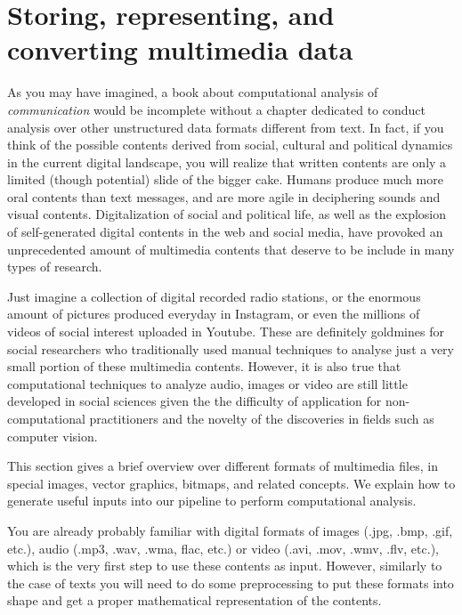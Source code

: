 \section{Storing, representing, and converting multimedia data}
\label{sec:storing}

As you may have imagined, a book about computational analysis of \textit{communication} would be incomplete without a chapter dedicated to conduct analysis over other unstructured data formats different from text. In fact, if you think of the possible contents derived from social, cultural and political dynamics in the current digital landscape, you will realize that written contents are only a limited (though potential) slide of the bigger cake. Humans produce much more oral contents than text messages, and are more agile in deciphering sounds and visual contents. Digitalization of social and political life, as well as the explosion of self-generated digital contents in the web and social media, have provoked an unprecedented amount of multimedia contents that deserve to be include in many types of research.

Just imagine a collection of digital recorded radio stations, or the enormous amount of pictures produced everyday in Instagram, or even the millions of videos of social interest uploaded in Youtube. These are definitely goldmines for social researchers who traditionally used manual techniques to analyse just a very small portion of these multimedia contents. However, it is also true that computational techniques to analyze audio, images or video are still little developed in social sciences given the the difficulty of application for non-computational practitioners and the novelty of the discoveries in fields such as computer vision. 

This section gives a brief overview over different formats of multimedia files, in special images, vector graphics, bitmaps, and related concepts. We explain how to generate useful inputs into our pipeline to perform computational analysis.

You are already probably familiar with digital formats of images (.jpg, .bmp, .gif, etc.), audio (.mp3, .wav, .wma, flac, etc.) or video (.avi, .mov, .wmv, .flv, etc.), which is the very first step to use these contents as input. However, similarly to the case of texts you will need to do some preprocessing to put these formats into shape and get a proper mathematical representation of the contents. 

